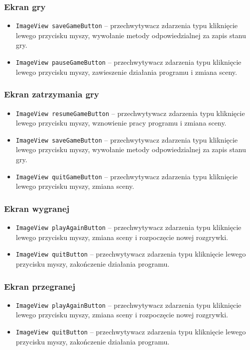 \documentclass[a4paper]{article}
\newcommand{\prog}{\texttt}
\begin{document}
\subsubsection{Ekran gry}
\begin{itemize}
    \item \prog{ImageView saveGameButton} -- przechwytywacz zdarzenia typu kliknięcie lewego przycisku myszy, wywołanie metody odpowiedzialnej za zapis stanu gry.
    \item \prog{ImageView pauseGameButton} -- przechwytywacz zdarzenia typu kliknięcie lewego przycisku myszy, zawieszenie działania programu i zmiana sceny.
\end{itemize}

\subsubsection{Ekran zatrzymania gry}
\begin{itemize}
    \item \prog{ImageView resumeGameButton} -- przechwytywacz zdarzenia typu kliknięcie lewego przycisku myszy, wznowienie pracy programu i zmiana sceny.
    \item \prog{ImageView saveGameButton} -- przechwytywacz zdarzenia typu kliknięcie lewego przycisku myszy, wywołanie metody odpowiedzialnej za zapis stanu gry.
    \item \prog{ImageView quitGameButton} -- przechwytywacz zdarzenia typu kliknięcie lewego przycisku myszy, zmiana sceny.    
\end{itemize}

\subsubsection{Ekran wygranej}
\begin{itemize}
    \item \prog{ImageView playAgainButton} -- przechwytywacz zdarzenia typu kliknięcie lewego przycisku myszy, zmiana sceny i rozpoczęcie nowej rozgrywki.
    \item \prog{ImageView quitButton} -- przechwytywacz zdarzenia typu kliknięcie lewego przycisku myszy, zakończenie działania programu.
\end{itemize}

\subsubsection{Ekran przegranej}
\begin{itemize}
    \item \prog{ImageView playAgainButton} -- przechwytywacz zdarzenia typu kliknięcie lewego przycisku myszy, zmiana sceny i rozpoczęcie nowej rozgrywki.
    \item \prog{ImageView quitButton} -- przechwytywacz zdarzenia typu kliknięcie lewego przycisku myszy, zakończenie działania programu.    
\end{itemize}
\end{document}
